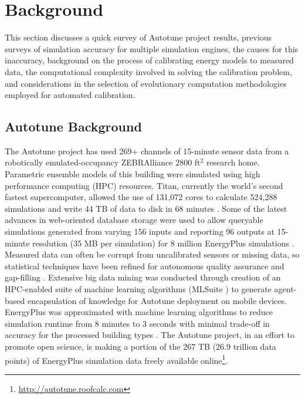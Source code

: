 \documentclass[preprint, review, 12pt]{elsarticle}
\begin{document}
\section{Background}
\label{sec:background}
This section discusses a quick survey of Autotune project results, previous surveys of simulation accuracy for multiple simulation engines, the causes for this inaccuracy, background on the process of calibrating energy models to measured data, the computational complexity involved in solving the calibration problem, and considerations in the selection of evolutionary computation methodologies employed for automated calibration.

\subsection{Autotune Background}
The Autotune project has used 269+ channels of 15-minute sensor data from a robotically emulated-occupancy ZEBRAlliance \cite{cit:miller2012,cit:biswas2012} 2800 ft$^2$ research home. Parametric ensemble models of this building were simulated using high performance computing (HPC) resources. Titan, currently the world’s second fastest supercomputer, allowed the use of 131,072 cores to calculate 524,288 simulations and write 44 TB of data to disk in 68 minutes \cite{cit:sanyal2013a}. Some of the latest advances in web-oriented database storage were used to allow queryable simulations generated from varying 156 inputs and reporting 96 outputs at 15-minute resolution (35 MB per simulation) for 8 million EnergyPlus simulations \cite{cit:sanyal2013b}. Measured data can often be corrupt from uncalibrated sensors or missing data, so statistical techniques have been refined for autonomous quality assurance and gap-filling \cite{cit:castello2012}. Extensive big data mining was conducted through creation of an HPC-enabled suite of machine learning algorithms (MLSuite \cite{cit:edwards2013}) to generate agent-based encapsulation of knowledge for Autotune deployment on mobile devices. EnergyPlus was approximated with machine learning algorithms to reduce simulation runtime from 8 minutes to 3 seconds with minimal trade-off in accuracy for the processed building types \cite{cit:edwards2013}. The Autotune project, in an effort to promote open science, is making a portion of the 267 TB (26.9 trillion data points) of EnergyPlus simulation data freely available online\footnote{\url{http://autotune.roofcalc.com}}.
\end{document}
